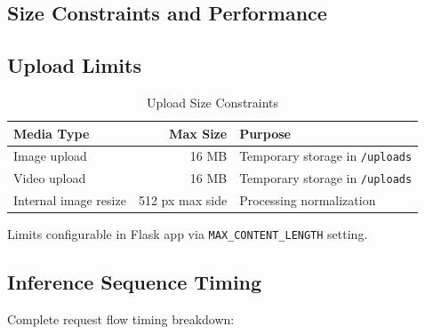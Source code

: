 \documentclass[12pt,a4paper]{book}
\begin{document}
\begin{itemize}
\section{Size Constraints and Performance}

\subsection{Upload Limits}

\begin{table}[H]
\centering
\captionsetup{justification=centering}
\caption{Upload Size Constraints}
\begin{tabular}{|l|r|p{4cm}|}
\hline
\textbf{Media Type} & \textbf{Max Size} & \textbf{Purpose} \\
\hline
Image upload & 16 MB & Temporary storage in \texttt{/uploads} \\
\hline
Video upload & 16 MB & Temporary storage in \texttt{/uploads} \\
\hline
Internal image resize & 512 px max side & Processing normalization \\
\hline
\end{tabular}
\end{table}

Limits configurable in Flask app via \texttt{MAX\_CONTENT\_LENGTH} setting.

\subsection{Inference Sequence Timing}

Complete request flow timing breakdown:


\end{itemize}
\end{document}
